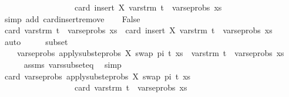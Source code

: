 \begin{isabellebody}
\ \ \ \ \ \ \ \ \ \ \ \ \ \ \ \ \ {\isacharless}{\kern0pt}\ card\ {\isacharparenleft}{\kern0pt}insert\ X\ {\isacharparenleft}{\kern0pt}vars{\isacharunderscore}{\kern0pt}trm\ t\ {\isasymunion}\ vars{\isacharunderscore}{\kern0pt}eprobs\ xs{\isacharparenright}{\kern0pt}{\isacharparenright}{\kern0pt}{\isachardoublequoteclose}\isanewline
\ \ \ \ \isamarkupfalse%
\ {\isacharparenleft}{\kern0pt}simp\ add{\isacharcolon}{\kern0pt}\ card{\isachardot}{\kern0pt}insert{\isacharunderscore}{\kern0pt}remove{\isacharparenright}{\kern0pt}\isanewline
{}\isamarkupfalse%
\isanewline
\ \ \isamarkupfalse%
\ False\isanewline
\ \ \isamarkupfalse%
\ {\isachardoublequoteopen}card\ {\isacharparenleft}{\kern0pt}vars{\isacharunderscore}{\kern0pt}trm\ t\ {\isasymunion}\ vars{\isacharunderscore}{\kern0pt}eprobs\ xs{\isacharparenright}{\kern0pt}\ {\isacharless}{\kern0pt}\ card\ {\isacharparenleft}{\kern0pt}insert\ X\ {\isacharparenleft}{\kern0pt}vars{\isacharunderscore}{\kern0pt}trm\ t\ {\isasymunion}\ vars{\isacharunderscore}{\kern0pt}eprobs\ xs{\isacharparenright}{\kern0pt}{\isacharparenright}{\kern0pt}{\isachardoublequoteclose}\isanewline
\ \ \ \ \isamarkupfalse%
\ auto\isanewline
\ \ \isamarkupfalse%
\ \isamarkupfalse%
\ subset{\isacharcolon}{\kern0pt}\isanewline
\ \ \ \ {\isachardoublequoteopen}vars{\isacharunderscore}{\kern0pt}eprobs\ {\isacharparenleft}{\kern0pt}apply{\isacharunderscore}{\kern0pt}subst{\isacharunderscore}{\kern0pt}eprobs\ {\isacharbrackleft}{\kern0pt}{\isacharparenleft}{\kern0pt}X{\isacharcomma}{\kern0pt}\ swap\ pi\ t{\isacharparenright}{\kern0pt}{\isacharbrackright}{\kern0pt}\ xs{\isacharparenright}{\kern0pt}\ {\isasymsubseteq}\ vars{\isacharunderscore}{\kern0pt}trm\ t\ {\isasymunion}\ vars{\isacharunderscore}{\kern0pt}eprobs\ xs{\isachardoublequoteclose}\isanewline
\ \ \ \ \isamarkupfalse%
\ assms\ vars{\isacharunderscore}{\kern0pt}subseteq\ \isamarkupfalse%
\ simp\isanewline
\ \ \isamarkupfalse%
\ {\isachardoublequoteopen}card\ {\isacharparenleft}{\kern0pt}vars{\isacharunderscore}{\kern0pt}eprobs\ {\isacharparenleft}{\kern0pt}apply{\isacharunderscore}{\kern0pt}subst{\isacharunderscore}{\kern0pt}eprobs\ {\isacharbrackleft}{\kern0pt}{\isacharparenleft}{\kern0pt}X{\isacharcomma}{\kern0pt}\ swap\ pi\ t{\isacharparenright}{\kern0pt}{\isacharbrackright}{\kern0pt}\ xs{\isacharparenright}{\kern0pt}{\isacharparenright}{\kern0pt}\isanewline
\ \ \ \ \ \ \ \ \ \ \ \ \ \ \ \ \ {\isasymle}\ card\ {\isacharparenleft}{\kern0pt}vars{\isacharunderscore}{\kern0pt}trm\ t\ {\isasymunion}\ vars{\isacharunderscore}{\kern0pt}eprobs\ xs{\isacharparenright}{\kern0pt}{\isachardoublequoteclose}\isanewline

\end{isabellebody}
